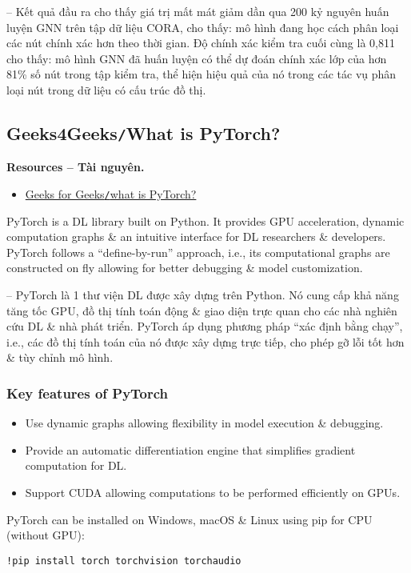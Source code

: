 \documentclass{article}
\begin{document}
-- Kết quả đầu ra cho thấy giá trị mất mát giảm dần qua 200 kỷ nguyên huấn luyện GNN trên tập dữ liệu CORA, cho thấy: mô hình đang học cách phân loại các nút chính xác hơn theo thời gian. Độ chính xác kiểm tra cuối cùng là 0,811 cho thấy: mô hình GNN đã huấn luyện có thể dự đoán chính xác lớp của hơn 81\% số nút trong tập kiểm tra, thể hiện hiệu quả của nó trong các tác vụ phân loại nút trong dữ liệu có cấu trúc đồ thị.


\subsection{Geeks4Geeks{\tt/}What is PyTorch?}
\textbf{\textsf{Resources -- Tài nguyên.}}
\begin{itemize}
    \item \href{https://www.geeksforgeeks.org/deep-learning/getting-started-with-pytorch/}{Geeks for Geeks{\tt/}what is PyTorch?}
\end{itemize}
PyTorch is a DL library built on Python. It provides GPU acceleration, dynamic computation graphs \& an intuitive interface for DL researchers \& developers. PyTorch follows a ``define-by-run'' approach, i.e., its computational graphs are constructed on fly allowing for better debugging \& model customization.

-- PyTorch là 1 thư viện DL được xây dựng trên Python. Nó cung cấp khả năng tăng tốc GPU, đồ thị tính toán động \& giao diện trực quan cho các nhà nghiên cứu DL \& nhà phát triển. PyTorch áp dụng phương pháp ``xác định bằng chạy'', i.e., các đồ thị tính toán của nó được xây dựng trực tiếp, cho phép gỡ lỗi tốt hơn \& tùy chỉnh mô hình.


\subsubsection{Key features of PyTorch}

\begin{itemize}
    \item Use dynamic graphs allowing flexibility in model execution \& debugging.
    \item Provide an automatic differentiation engine that simplifies gradient computation for DL.
    \item Support CUDA allowing computations to be performed efficiently on GPUs.
\end{itemize}
PyTorch can be installed on Windows, macOS \& Linux using pip for CPU (without GPU):
\begin{verbatim}
!pip install torch torchvision torchaudio
\end{verbatim}
\end{document}
